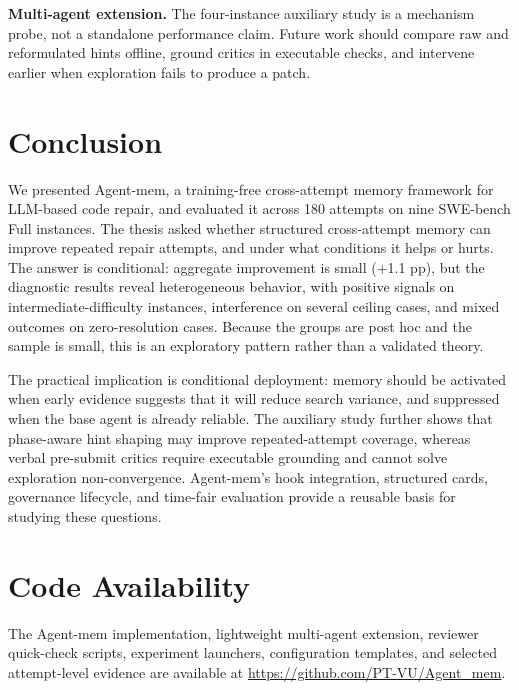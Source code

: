 \documentclass[runningheads]{llncs}
\begin{document}
\textbf{Multi-agent extension.} The four-instance auxiliary study is a mechanism probe, not a standalone performance claim. Future work should compare raw and reformulated hints offline, ground critics in executable checks, and intervene earlier when exploration fails to produce a patch.

\section{Conclusion}

We presented Agent-mem, a training-free cross-attempt memory framework for LLM-based code repair, and evaluated it across 180 attempts on nine SWE-bench Full instances. The thesis asked whether structured cross-attempt memory can improve repeated repair attempts, and under what conditions it helps or hurts. The answer is conditional: aggregate improvement is small (+1.1 pp), but the diagnostic results reveal heterogeneous behavior, with positive signals on intermediate-difficulty instances, interference on several ceiling cases, and mixed outcomes on zero-resolution cases. Because the groups are post hoc and the sample is small, this is an exploratory pattern rather than a validated theory.

The practical implication is conditional deployment: memory should be activated when early evidence suggests that it will reduce search variance, and suppressed when the base agent is already reliable. The auxiliary study further shows that phase-aware hint shaping may improve repeated-attempt coverage, whereas verbal pre-submit critics require executable grounding and cannot solve exploration non-convergence. Agent-mem's hook integration, structured cards, governance lifecycle, and time-fair evaluation provide a reusable basis for studying these questions.

\section*{Code Availability}

The Agent-mem implementation, lightweight multi-agent extension, reviewer quick-check scripts, experiment launchers, configuration templates, and selected attempt-level evidence are available at \url{https://github.com/PT-VU/Agent_mem}.
\end{document}
